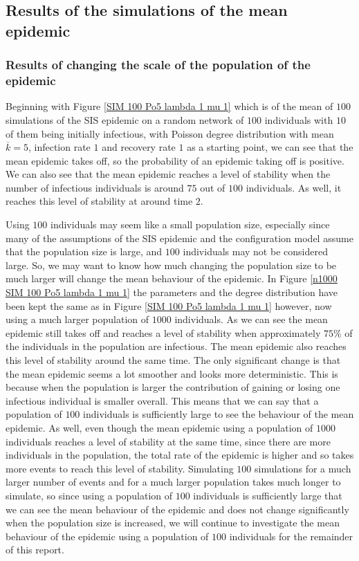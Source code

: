 \documentclass{uonmathsreport}
\begin{document}
\subsection{Results of the simulations of the mean epidemic}
\label{subsub:5.5}

\subsubsection{Results of changing the scale of the population of the epidemic} \label{subsub:5.5.1}

Beginning with Figure \ref{SIM 100 Po5 lambda 1 mu 1} which is of the mean of $100$ simulations of the SIS epidemic on a random network of $100$ individuals with $10$ of them being initially infectious, with Poisson degree distribution with mean $\overline{k}=5$, infection rate $1$ and recovery rate $1$ as a starting point, we can see that the mean epidemic takes off, so the probability of an epidemic taking off is positive. We can also see that the mean epidemic reaches a level of stability when the number of infectious individuals is around $75$ out of $100$ individuals. As well, it reaches this level of stability at around time $2$.

Using $100$ individuals may seem like a small population size, especially since many of the assumptions of the SIS epidemic and the configuration model assume that the population size is large, and $100$ individuals may not be considered large. So, we may want to know how much changing the population size to be much larger will change the mean behaviour of the epidemic. In Figure \ref{n1000 SIM 100 Po5 lambda 1 mu 1} the parameters and the degree distribution have been kept the same as in Figure \ref{SIM 100 Po5 lambda 1 mu 1} however, now using a much larger population of $1000$ individuals. As we can see the mean epidemic still takes off and reaches a level of stability when approximately $75\%$ of the individuals in the population are infectious. The mean epidemic also reaches this level of stability around the same time. The only significant change is that the mean epidemic seems a lot smoother and looks more deterministic. This is because when the population is larger the contribution of gaining or losing one infectious individual is smaller overall. This means that we can say that a population of $100$ individuals is sufficiently large to see the behaviour of the mean epidemic. As well, even though the mean epidemic using a population of $1000$ individuals reaches a level of stability at the same time, since there are more individuals in the population, the total rate of the epidemic is higher and so takes more events to reach this level of stability. Simulating $100$ simulations for a much larger number of events and for a much larger population takes much longer to simulate, so since using a population of $100$ individuals is sufficiently large that we can see the mean behaviour of the epidemic and does not change significantly  when the population size is increased, we will continue to investigate the mean behaviour of the epidemic using a population of $100$ individuals for the remainder of this report.
\end{document}
